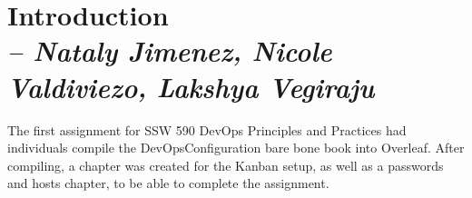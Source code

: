 \chapter{Introduction \\
\small{\textit{-- Nataly Jimenez, Nicole Valdiviezo, Lakshya Vegiraju}}
\label{Chapter::Introduction}}

 
The first assignment for SSW 590 DevOps Principles and Practices had individuals compile the DevOpsConfiguration bare bone book into Overleaf. After compiling, a chapter was created for the Kanban setup, as well as a passwords and hosts chapter, to be able to complete the assignment.



